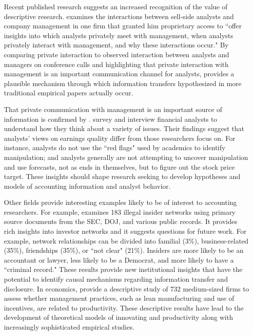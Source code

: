 \documentclass[12pt,reqno,titlepage]{amsart}
\begin{document}
\begin{doublespace}
Recent published research suggests an increased recognition of the value of descriptive research.
\citet{Soltes:2013ba} examines the interactions between sell-side analysts and company management in one firm that granted him proprietary access to ``offer insights into which analysts privately meet with management, when analysts privately interact with management, and why these interactions occur."  
By comparing private interaction to observed interaction between analysts and managers on conference calls and highlighting that private interaction with management is an important communication channel for analysts, \citet{Soltes:2013ba} provides a plausible mechanism through which information transfers hypothesized in more traditional empirical papers actually occur.

That private communication with management is an important source of information is confirmed by  \citet{Brown:2015kd}.
\citet{Brown:2015kd} survey and interview financial analysts to understand how they think about a variety of issues. 
Their findings suggest that analysts' views on earnings quality differ from those researchers focus on. 
For instance, analysts do not use the ``red flags" used by academics to identify manipulation; and analysts generally are not attempting to uncover manipulation and use forecasts, not as ends in themselves, but to figure out the stock price target.
These insights should shape research seeking to develop hypotheses and models of accounting information and analyst behavior.

Other fields provide interesting examples likely to be of interest to accounting researchers.
For example, \citet{Ahern:2014id} examines 183 illegal insider networks using primary source documents from the SEC, DOJ, and various public records. 
It provides rich insights into investor networks and it suggests questions for future work.
For example, network relationships can be divided into familial (3\%), business-related (35\%), friendships (35\%), or ``not clear" (21\%).
Insiders are more likely to be an accountant or lawyer, less likely to be a Democrat, and more likely to have a ``criminal record."
These results provide new institutional insights that have the potential to identify causal mechanisms regarding information transfer and disclosure.
In economics, \citet{Bloom:2007ed} provide a descriptive study of 732 medium-sized firms to assess whether management practices, such as lean manufacturing and use of incentives, are related to productivity. These descriptive results have lead to the development of theoretical models of innovating and productivity along with increasingly sophisticated empirical studies.


\end{doublespace}
\end{document}
